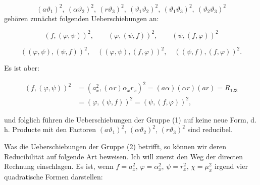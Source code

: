 \documentclass[11pt]{article}
\providecommand{\weberpage}[1]{}
\providecommand{\weq}[2]{\begin{equation}\tag{#1}#2\end{equation}}
\begin{document}
\[
(a\vartheta_1)^2,\ (\alpha\vartheta_2)^2,\ (r\vartheta_3)^2,\ (\vartheta_1\vartheta_2)^2,\ (\vartheta_1\vartheta_3)^2,\ (\vartheta_2\vartheta_3)^2
\]
gehören zunächst folgenden Ueberschiebungen an:

\weq{1}{(f,(\varphi,\psi))^2,\qquad (\varphi,(\psi,f))^2,\qquad (\psi,(f,\varphi))^2}

\weq{2}{((\varphi,\psi),(\psi,f))^2,\quad ((\varphi,\psi),(f,\varphi))^2,\quad ((\psi,f),(f,\varphi))^2.}

Es ist aber:

\weq{I}{\begin{aligned} (f,(\varphi,\psi))^2 &= (a_x^2,(\alpha r)\alpha_xr_x)^2 = (a\alpha)(\alpha r)(ar) = R_{123}\\ &= (\varphi,(\psi,f))^2 = (\psi,(f,\varphi))^2,\end{aligned}}

und folglich führen die Ueberschiebungen der Gruppe (1) auf keine neue Form, d. h.
Producte mit den Factoren $(a\vartheta_1)^2$, $(\alpha\vartheta_2)^2$,
$(r\vartheta_3)^2$ sind reducibel.

Was die Ueberschiebungen der Gruppe (2) betrifft, so können wir deren
Reducibilität auf folgende Art beweisen. Ich will zuerst den Weg der directen
Rechnung einschlagen. Es ist, wenn $f=a_x^2$, $\varphi=\alpha_x^2$, $\psi=r_x^2$,
$\chi=\mu_x^2$ irgend vier quadratische Formen darstellen:


\weberpage{149}
\end{document}
